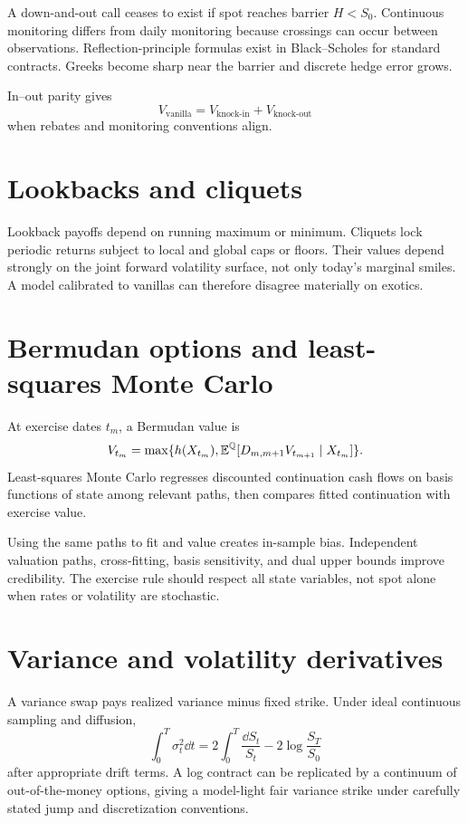 A down-and-out call ceases to exist if spot reaches barrier $H<S_0$. Continuous
monitoring differs from daily monitoring because crossings can occur between
observations. Reflection-principle formulas exist in Black--Scholes for standard
contracts. Greeks become sharp near the barrier and discrete hedge error grows.

In--out parity gives
\[
V_{\mathrm{vanilla}}=V_{\mathrm{knock\mbox{-}in}}+
V_{\mathrm{knock\mbox{-}out}}
\]
when rebates and monitoring conventions align.

\section{Lookbacks and cliquets}

Lookback payoffs depend on running maximum or minimum. Cliquets lock periodic
returns subject to local and global caps or floors. Their values depend strongly on
the joint forward volatility surface, not only today's marginal smiles. A model
calibrated to vanillas can therefore disagree materially on exotics.

\section{Bermudan options and least-squares Monte Carlo}

At exercise dates $t_m$, a Bermudan value is
\[
V_{t_m}=\max\{h(X_{t_m}),\operatorname{\mathbb E}^\mathbb Q[D_{m,m+1}V_{t_{m+1}}\mid X_{t_m}]\}.
\]
Least-squares Monte Carlo regresses discounted continuation cash flows on basis
functions of state among relevant paths, then compares fitted continuation with
exercise value.

Using the same paths to fit and value creates in-sample bias. Independent valuation
paths, cross-fitting, basis sensitivity, and dual upper bounds improve credibility.
The exercise rule should respect all state variables, not spot alone when rates or
volatility are stochastic.

\section{Variance and volatility derivatives}

A variance swap pays realized variance minus fixed strike. Under ideal continuous
sampling and diffusion,
\[
\int_0^T\sigma_t^2\dd t
=2\int_0^T\frac{\dd S_t}{S_t}
-2\log\frac{S_T}{S_0}
\]
after appropriate drift terms. A log contract can be replicated by a continuum of
out-of-the-money options, giving a model-light fair variance strike under carefully
stated jump and discretization conventions.

